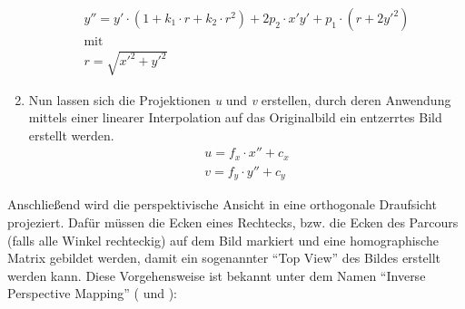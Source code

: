 \begin{enumerate}
\begin{gather*}
	{y}'' = y'\cdot \left ( 1+k_1\cdot r + k_2\cdot r^2 \right )+2 p_2\cdot x'y'+p_1\cdot \left ( r+2{y}'^2 \right )\\[1mm] \text{mit} \\[1mm]
	r=\sqrt{{x}'^2+{y}'^2}
	\end{gather*}
	\item Nun lassen sich die Projektionen \textit{u} und \textit{v} erstellen, durch deren Anwendung mittels einer linearer Interpolation auf das Originalbild ein entzerrtes Bild erstellt werden. 
	\begin{align*}
	u = f_x \cdot {x}'' + c_x\\
	v = f_y \cdot {y}'' + c_y
	\end{align*}
\end{enumerate}

Anschließend wird die perspektivische Ansicht in eine orthogonale Draufsicht projeziert. Dafür müssen die Ecken eines Rechtecks, bzw. die Ecken des Parcours (falls alle Winkel rechteckig) auf dem Bild markiert und eine homographische Matrix gebildet werden, damit ein sogenannter "`Top View"' des Bildes erstellt werden kann. Diese Vorgehensweise ist bekannt unter dem Namen "`Inverse Perspective Mapping"' (\cite{Galway} und \cite{Peter}): 
